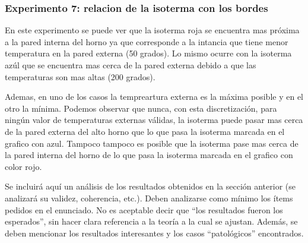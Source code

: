 \subsubsection*{Experimento 7: relacion de la isoterma con los bordes}
 	En este experimento se puede ver que la isoterma roja se encuentra mas próxima a la pared interna del horno ya que corresponde a la intancia que tiene menor temperatura en la pared externa (50 grados). Lo mismo ocurre con la isoterma azúl que se encuentra mas cerca de la pared externa debido a que las temperaturas son mas altas (200 grados).

 	Ademas, en uno de los casos la tempreartura externa es la máxima posible y en el otro la mínima. Podemos observar que nunca, con esta discretización, para ningún valor de temperaturas externas válidas, la isoterma puede pasar mas cerca de la pared externa del alto horno que lo que pasa la isoterma marcada en el grafico con azul. Tampoco tampoco es posible que la isoterma pase mas cerca de la pared interna del horno de lo que pasa la isoterma marcada en el grafico con color rojo.


  {\color{Gray} Se incluirá aquí un análisis de los resultados obtenidos en la sección anterior (se analizará su validez, coherencia, etc.). Deben analizarse como mínimo los ítems pedidos en el enunciado. No es aceptable decir que ``los resultados fueron los esperados'', sin hacer clara referencia a la teoría a la cual se ajustan. Además, se deben mencionar los resultados interesantes y los casos ``patológicos'' encontrados.}
